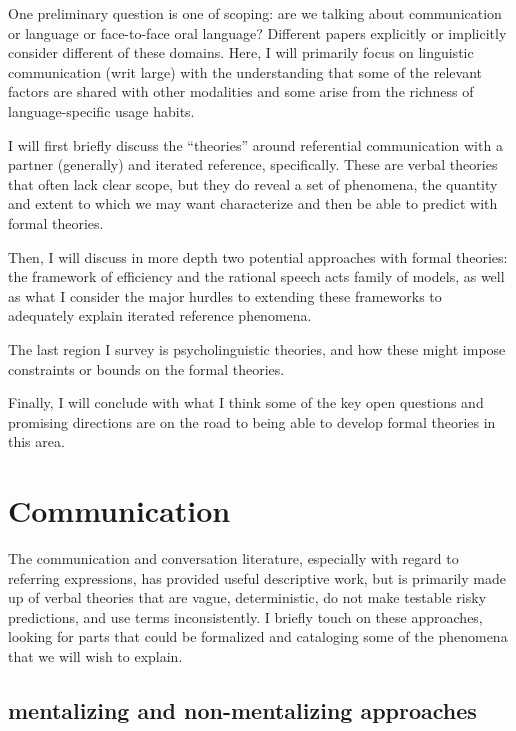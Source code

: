 \documentclass[]{article}
\begin{document}
One preliminary question is one of scoping: are we talking about communication or language or face-to-face oral language? Different papers explicitly or implicitly consider different of these domains. Here, I will primarily focus on linguistic communication (writ large) with the understanding that some of the relevant factors are shared with other modalities and some arise from the richness of language-specific usage habits. %

I will first briefly discuss the ``theories'' around referential communication with a partner (generally) and iterated reference, specifically. These are verbal theories that often lack clear scope, but they do reveal a set of phenomena, the quantity and extent to which we may want characterize and then be able to predict with formal theories. 

Then, I will discuss in more depth two potential approaches with formal theories: the framework of efficiency and the rational speech acts family of models, as well as what I consider the major hurdles to extending these frameworks to adequately explain iterated reference phenomena. 

The last region I survey is psycholinguistic theories, and how these might impose constraints or bounds on the formal theories. 

Finally, I will conclude with what I think some of the key open questions and promising directions are on the road to being able to develop formal theories in this area. 

\section{Communication}
The communication and conversation literature, especially with regard to referring expressions, has provided useful descriptive work, but is primarily made up of verbal theories that are vague, deterministic, do not make testable risky predictions, and use terms inconsistently. I briefly touch on these approaches, looking for parts that could be formalized and cataloging some of the phenomena that we will wish to explain. 

\subsection{mentalizing and non-mentalizing approaches}
\end{document}
